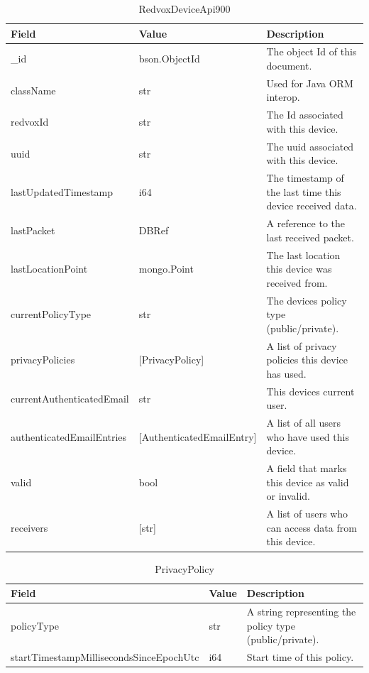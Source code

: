 \begin{table}[H]
	\centering
	\caption{RedvoxDeviceApi900}
	\begin{tabularx}{\textwidth}{llX}
		\toprule
		\textbf{Field} & \textbf{Value} & \textbf{Description} \\
		\midrule
		\_id & bson.ObjectId & The object Id of this document. \\
		className & str & Used for Java ORM interop. \\
		redvoxId & str & The Id associated with this device. \\
		uuid & str & The uuid associated with this device. \\
		lastUpdatedTimestamp & i64 & The timestamp of the last time this device received data. \\
		lastPacket & DBRef & A reference to the last received packet. \\
		lastLocationPoint & mongo.Point & The last location this device was received from. \\
		currentPolicyType & str & The devices policy type (public/private). \\
		privacyPolicies & [PrivacyPolicy] & A list of privacy policies this device has used. \\
		currentAuthenticatedEmail & str & This devices current user. \\
		authenticatedEmailEntries & [AuthenticatedEmailEntry] & A list of all users who have used this device. \\
		valid & bool & A field that marks this device as valid or invalid. \\
		receivers & [str] & A list of users who can access data from this device. \\
		\bottomrule
	\end{tabularx}
	\label{table:RedvoxDeviceApi900}
\end{table}

\begin{table}[H]
	\centering
	\caption{PrivacyPolicy}
	\begin{tabularx}{\textwidth}{llX}
		\toprule
		\textbf{Field} & \textbf{Value} & \textbf{Description} \\
		\midrule
		policyType & str & A string representing the policy type (public/private). \\
		startTimestampMillisecondsSinceEpochUtc & i64 & Start time of this policy. \\
		\bottomrule
	\end{tabularx}
	\label{table:PrivacyPolicy}
\end{table}


